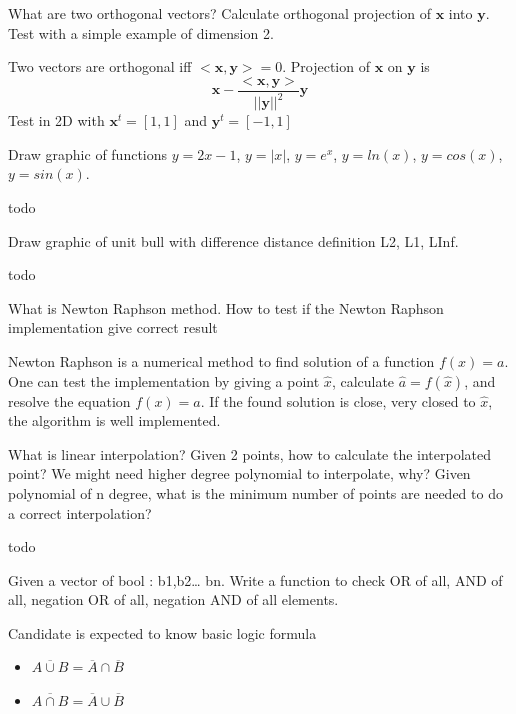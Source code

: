 \documentclass[answers]{exam}
\newcommand{\mathvec}[1]{\textbf{#1}}
\begin{document}
\begin{questions}
\question What are two orthogonal vectors? Calculate orthogonal projection of $\mathvec{x}$ into $\mathvec{y}$. Test with a simple example of dimension 2. 
\begin{solution}[.2in]
Two vectors are orthogonal iff $<\mathvec{x},\mathvec{y}>=0$. Projection of $\mathvec{x}$ on $\mathvec{y}$ is
\[
\mathvec{x} - \frac{<\mathvec{x},\mathvec{y}>}{||\mathvec{y}||^2} \mathvec{y}
\]
Test in 2D with $\mathvec{x}^t=[1,1]$ and $\mathvec{y}^t=[-1,1]$
\end{solution}

\question Draw graphic of functions $y=2x-1$, $y=|x|$, $y=e^x$, $y=ln(x)$, $y=cos(x)$, $y=sin(x)$.
\begin{solution}[.2in]
	todo
\end{solution}

\question Draw graphic of unit bull with difference distance definition L2, L1, LInf.
\begin{solution}[.2in]
	todo
\end{solution}

\question What is Newton Raphson method. How to test if the Newton Raphson implementation give correct result
\begin{solution}[.2in]
Newton Raphson is a numerical method to find solution of a function $f(x)=a$. One can test the implementation by giving a point $\hat{x}$, calculate $\hat{a}=f(\hat{x})$, and resolve the equation $f(x)=\hat{a}$. If the found solution is close, very closed to $\hat{x}$, the algorithm is well implemented.
\end{solution}

\question What is linear interpolation? Given 2 points, how to calculate the interpolated point? We might need higher degree polynomial to interpolate, why? Given polynomial of n degree, what is the minimum number of points are needed to do a correct interpolation?
\begin{solution}[.2in]
	todo
\end{solution}

\question Given a vector of bool : b1,b2… bn. Write a function to check OR of all, AND of all, negation OR of all, negation AND of all elements.
\begin{solution}[.2in]
Candidate is expected to know basic logic formula 
\begin{itemize}
	\item $\overline{A\cup B} = \overline{A}\cap \overline{B}$
    \item $\overline{A\cap B} = \overline{A}\cup \overline{B}$
\end{itemize}
\end{solution}


\end{questions}
\end{document}
